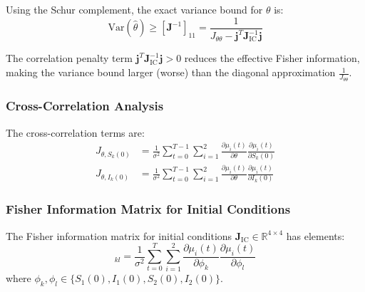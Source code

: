 Using the Schur complement, the exact variance bound for $\theta$ is:
\begin{equation}
\text{Var}(\hat{\theta}) \geq [\mathbf{J}^{-1}]_{11} = \frac{1}{J_{\theta\theta} - \mathbf{j}^T \mathbf{J}_{\text{IC}}^{-1} \mathbf{j}}
\end{equation}

The correlation penalty term $\mathbf{j}^T \mathbf{J}_{\text{IC}}^{-1} \mathbf{j} > 0$ reduces the effective Fisher information, making the variance bound larger (worse) than the diagonal approximation $\frac{1}{J_{\theta\theta}}$.

\subsubsection{Cross-Correlation Analysis}

The cross-correlation terms are:
\begin{align}
J_{\theta,S_k(0)} &= \frac{1}{\sigma^2} \sum_{t=0}^{T-1} \sum_{i=1}^2 \frac{\partial \mu_i(t)}{\partial \theta} \frac{\partial \mu_i(t)}{\partial S_k(0)} \\
J_{\theta,I_k(0)} &= \frac{1}{\sigma^2} \sum_{t=0}^{T-1} \sum_{i=1}^2 \frac{\partial \mu_i(t)}{\partial \theta} \frac{\partial \mu_i(t)}{\partial I_k(0)}
\end{align}

\subsubsection{Fisher Information Matrix for Initial Conditions}

The Fisher information matrix for initial conditions $\mathbf{J}_{\text{IC}} \in \mathbb{R}^{4 \times 4}$ has elements:
\begin{equation}
[\mathbf{J}_{\text{IC}}]_{kl} = \frac{1}{\sigma^2} \sum_{t=0}^T \sum_{i=1}^2 \frac{\partial \mu_i(t)}{\partial \phi_k} \frac{\partial \mu_i(t)}{\partial \phi_l}
\end{equation}
where $\phi_k, \phi_l \in \{S_1(0), I_1(0), S_2(0), I_2(0)\}$.


